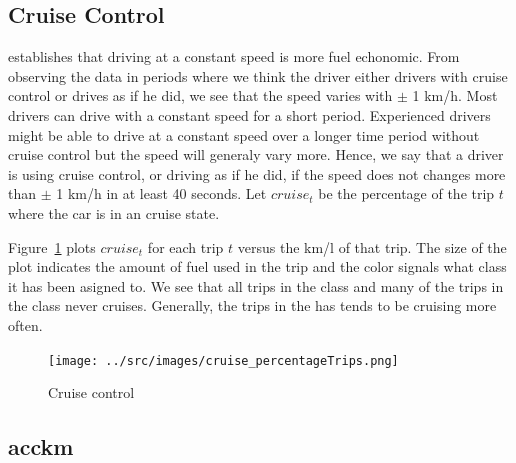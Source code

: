 \subsection{Cruise Control}

\cite{} establishes that driving at a constant speed is more fuel echonomic. 
From observing the data in periods where we think the driver either drivers with cruise control or drives as if he did, we see that the speed varies with $\pm$ 1 km/h.
Most drivers can drive with a constant speed for a short period. 
Experienced drivers might be able to drive at a constant speed over a longer time period without cruise control but the speed will generaly vary more. 
Hence, we say that a driver is using cruise control, or driving as if he did, if the speed does not changes more than $\pm$ 1 km/h in at least 40 seconds. %
Let $cruise_t$ be the percentage of the trip $t$ where the car is in an cruise state.

Figure~\ref{fig:cruiseTrips} plots $cruise_t$ for each trip $t$ versus the km/l of that trip.
The size of the plot indicates the amount of fuel used in the trip and the color signals what class it has been asigned to. 
We see that all trips in the \fuelLow class and many of the trips in the \fuelMedium class never cruises.
Generally, the trips in the \fuelHigh has tends to be cruising more often.

\begin{figure}
\centering
\texttt{[image: ../src/images/cruise\_percentageTrips.png]}
\caption{Cruise control}
\label{fig:cruiseTrips}
\end{figure}

\subsection{acckm}

